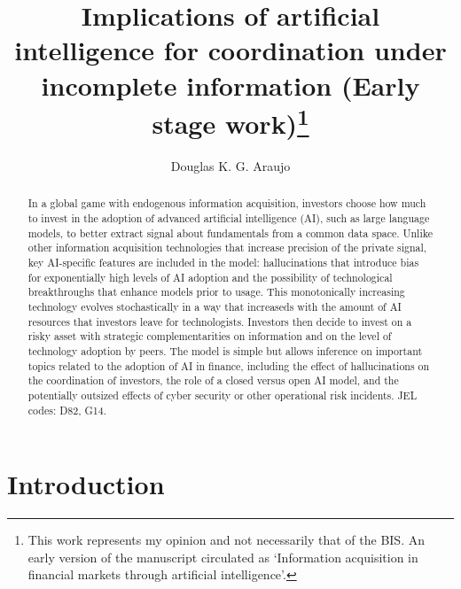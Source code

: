 \documentclass[
]{article}
\title{Implications of artificial intelligence for coordination under
incomplete information (Early stage work)\thanks{This work represents my
opinion and not necessarily that of the BIS. An early version of the
manuscript circulated as `Information acquisition in financial markets
through artificial intelligence'.}}
\author{Douglas K. G. Araujo}
\affil{%
                  Bank for International
Settlements, douglas.araujo@bis.org
              }
\date{}
\theoremstyle{plain}
\theoremstyle{definition}
\theoremstyle{remark}
\begin{document}
\maketitle
\begin{abstract}
In a global game with endogenous information acquisition, investors
choose how much to invest in the adoption of advanced artificial
intelligence (AI), such as large language models, to better extract
signal about fundamentals from a common data space. Unlike other
information acquisition technologies that increase precision of the
private signal, key AI-specific features are included in the model:
hallucinations that introduce bias for exponentially high levels of AI
adoption and the possibility of technological breakthroughs that enhance
models prior to usage. This monotonically increasing technology evolves
stochastically in a way that increaseds with the amount of AI resources
that investors leave for technologists. Investors then decide to invest
on a risky asset with strategic complementarities on information and on
the level of technology adoption by peers. The model is simple but
allows inference on important topics related to the adoption of AI in
finance, including the effect of hallucinations on the coordination of
investors, the role of a closed versus open AI model, and the
potentially outsized effects of cyber security or other operational risk
incidents. JEL codes: D82, G14.
\end{abstract}
\ifdefined\Shaded\renewenvironment{Shaded}{\begin{tcolorbox}[enhanced, sharp corners, borderline west={3pt}{0pt}{shadecolor}, breakable, frame hidden, boxrule=0pt, interior hidden]}{\end{tcolorbox}}\fi

\hypertarget{introduction}{%
\section{Introduction}\label{introduction}}
\end{document}
